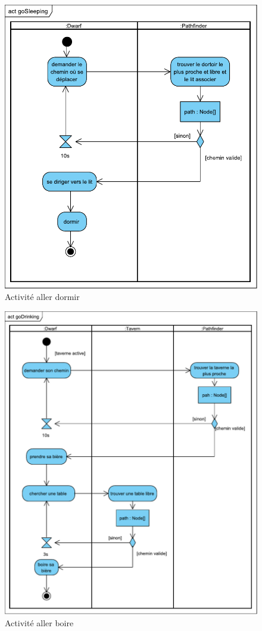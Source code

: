 \documentclass[a4paper]{report}
\begin{document}
\begin{figure}[bh]
    \center
    \includegraphics[width=15cm]{img/act/goSleeping}
    \caption{Activité aller dormir}
		\label{}
\end{figure}

\begin{figure}[H]
    \center
    \includegraphics[width=15cm]{img/act/goDrinking}
    \caption{Activité aller boire}
		\label{}
\end{figure}
\end{document}
